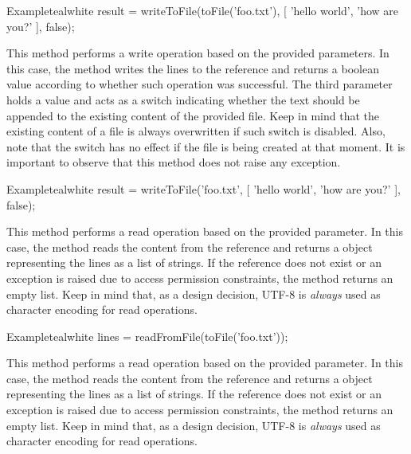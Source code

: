 \begin{description}
\begin{codebox}{Example}{teal}{\icnote}{white}
result = writeToFile(toFile('foo.txt'),
         [ 'hello world', 'how are you?' ], false);
\end{codebox}

\item[\mdbox{R}{\parbox{0.51\textwidth}{writeToFile(String reference,\\\hspace*{1em} List<String> lines, boolean append)}}{boolean}] This method performs a write operation based on the provided parameters. In this case, the method writes the  lines to the  reference and returns a boolean value according to whether such operation was successful. The third parameter holds a  value and acts as a switch indicating whether the text should be appended to the existing content of the provided file. Keep in mind that the existing content of a file is always overwritten if such switch is disabled. Also, note that the switch has no effect if the file is being created at that moment. It is important to observe that this method does not raise any exception.

\begin{codebox}{Example}{teal}{\icnote}{white}
result = writeToFile('foo.txt', [ 'hello world',
         'how are you?' ], false);
\end{codebox}

\item[\mdbox{R}{readFromFile(File file)}{List<String>}] This method performs a read operation based on the provided parameter. In this case, the method reads the content from the  reference and returns a  object representing the lines as a list of strings. If the reference does not exist or an exception is raised due to access permission constraints, the  method returns an empty list. Keep in mind that, as a design decision, UTF-8 is \emph{always} used as character encoding for read operations.

\begin{codebox}{Example}{teal}{\icnote}{white}
lines = readFromFile(toFile('foo.txt'));
\end{codebox}

\item[\mdbox{R}{readFromFile(String reference)}{List<String>}] This method performs a read operation based on the provided parameter. In this case, the method reads the content from the  reference and returns a  object representing the lines as a list of strings. If the reference does not exist or an exception is raised due to access permission constraints, the  method returns an empty list. Keep in mind that, as a design decision, UTF-8 is \emph{always} used as character encoding for read operations.


\end{description}
